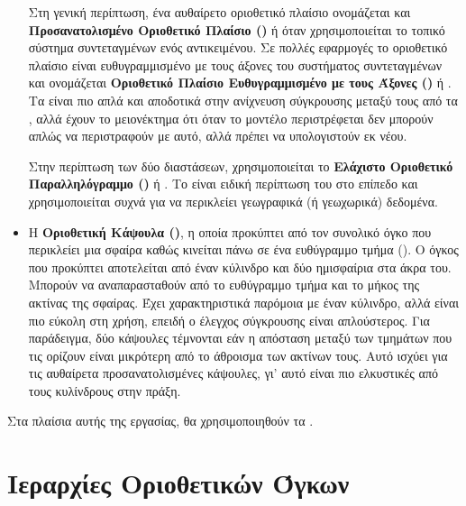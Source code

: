 \begin{itemize}
    Στη γενική περίπτωση, 
    ένα αυθαίρετο οριοθετικό πλαίσιο ονομάζεται και \textbf{Προσανατολισμένο 
    Οριοθετικό Πλαίσιο ()} \textbf{} 
    ή \textbf{} όταν χρησιμοποιείται το τοπικό σύστημα 
    συντεταγμένων ενός αντικειμένου.
    Σε πολλές εφαρμογές το οριοθετικό πλαίσιο είναι ευθυγραμμισμένο με τους 
    άξονες του συστήματος συντεταγμένων και ονομάζεται \textbf{Οριοθετικό 
    Πλαίσιο Ευθυγραμμισμένο με τους Άξονες ()}
    ή \textbf{}. 
    Τα  είναι πιο απλά και αποδοτικά στην ανίχνευση 
    σύγκρουσης μεταξύ τους από τα , αλλά έχουν το μειονέκτημα ότι 
    όταν το μοντέλο  περιστρέφεται δεν μπορούν απλώς να περιστραφούν με αυτό, 
    αλλά πρέπει να υπολογιστούν εκ νέου. 

    Στην περίπτωση των δύο διαστάσεων, χρησιμοποιείται το 
    \textbf{Ελάχιστο Οριοθετικό Παραλληλόγραμμο ()}
    ή . Το  είναι ειδική περίπτωση του  στο 
    επίπεδο και χρησιμοποιείται συχνά για να περικλείει γεωγραφικά (ή γεωχωρικά)
    δεδομένα.

    \item H \textbf{Οριοθετική Κάψουλα ()}, 
    η οποία προκύπτει από τον συνολικό όγκο που περικλείει μια σφαίρα 
    καθώς κινείται πάνω σε ένα ευθύγραμμο τμήμα (). 
    Ο όγκος που προκύπτει αποτελείται από έναν κύλινδρο και δύο 
    ημισφαίρια στα άκρα του.
    Μπορούν να αναπαρασταθούν από το ευθύγραμμο τμήμα και το μήκος 
    της ακτίνας της σφαίρας.
    Έχει χαρακτηριστικά παρόμοια με έναν κύλινδρο, αλλά είναι πιο εύκολη 
    στη χρήση, επειδή ο έλεγχος σύγκρουσης είναι απλούστερος.
    Για παράδειγμα, δύο κάψουλες τέμνονται εάν η απόσταση μεταξύ των τμημάτων
    που τις ορίζουν είναι μικρότερη από το άθροισμα των ακτίνων τους.
    Αυτό ισχύει για τις αυθαίρετα προσανατολισμένες κάψουλες, γι' 
    αυτό είναι πιο ελκυστικές από τους κυλίνδρους στην πράξη.
\end{itemize}

Στα πλαίσια αυτής της εργασίας, θα χρησιμοποιηθούν τα .

\section{Ιεραρχίες Οριοθετικών Όγκων}

\label{sec:bvh}
